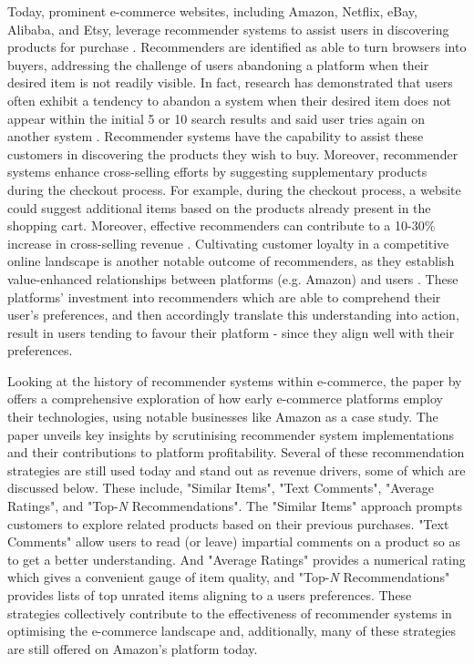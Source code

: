 Today, prominent e-commerce websites, including Amazon, Netflix, eBay, Alibaba, and Etsy, leverage recommender systems to assist users in discovering products for purchase \cite{aivazoglou2020fine}. Recommenders are identified as able to turn browsers into buyers, addressing the challenge of users abandoning a platform when their desired item is not readily visible. In fact, research has demonstrated that users often exhibit a tendency to abandon a system when their desired item does not appear within the initial 5 or 10 search results and said user tries again on another system \cite{linden2003amazon}. Recommender systems have the capability to assist these customers in discovering the products they wish to buy. Moreover, recommender systems enhance cross-selling efforts by suggesting supplementary products during the checkout process. For example, during the checkout process, a website could suggest additional items based on the products already present in the shopping cart. Moreover, effective recommenders can contribute  to a 10-30\% increase in cross-selling revenue \cite{mckinsey_personalization_2021}. Cultivating customer loyalty in a competitive online landscape is another notable outcome of recommenders, as they establish value-enhanced relationships between platforms (e.g. Amazon) and users \cite{linden2003amazon}. These platforms' investment into recommenders which are able to comprehend their user’s preferences, and then accordingly translate this understanding into action, result in users tending to favour their platform - since they align well with their preferences.



Looking at the history of recommender systems within e-commerce, the paper by \cite{schafer1999recommender} offers a comprehensive exploration of how early e-commerce platforms employ their technologies, using notable businesses like Amazon as a case study. The paper unveils key insights by scrutinising recommender system implementations and their contributions to platform profitability. Several of these recommendation strategies are still used today and stand out as revenue drivers, some of which are discussed below. These include, "Similar Items", "Text Comments", "Average Ratings", and "Top-\textit{N} Recommendations". The "Similar Items" approach prompts customers to explore related products based on their previous purchases. "Text Comments" allow users to read (or leave) impartial comments on a product so as to get a better understanding. And "Average Ratings" provides a numerical rating which gives a convenient gauge of item quality, and "Top-\textit{N} Recommendations" provides lists of top unrated items aligning to a users preferences. These strategies collectively contribute to the effectiveness of recommender systems in optimising the e-commerce landscape and, additionally, many of these strategies are still offered on Amazon’s platform today. 


